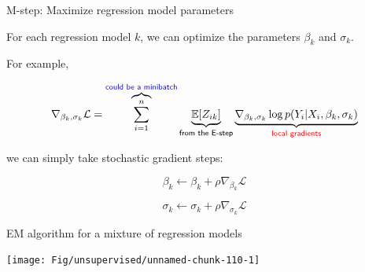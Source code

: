 \documentclass[
  ignorenonframetext,
  aspectratio=169]{beamer}
\begin{document}
\begin{frame}{M-step: Maximize regression model parameters}
\protect\hypertarget{m-step-maximize-regression-model-parameters}{}
\scriptsize

\normalsize

For each regression model \(k\), we can optimize the parameters
\(\beta_{k}\) and \(\sigma_{k}\).

For example,

\[\nabla_{\beta_{k}, \sigma_{k}} \mathcal{L} = 
\overbrace{\sum_{i=1}^{n}}^{\textsf{\color{blue} could be a minibatch}}
\underbrace{\mathbb{E}\!\left[Z_{ik}\right]}_{\textsf{from the E-step}} 
\underbrace{\nabla_{\beta_{k}, \sigma_{k}} \log p(Y_{i}|X_{i}, \beta_{k}, \sigma_{k})}_{\textsf{\color{red} local gradients}}\]

we can simply take stochastic gradient steps:

\[\beta_{k} \gets \beta_{k} + \rho \nabla_{\beta_{k}} \mathcal{L}\]

\[\sigma_{k} \gets \sigma_{k} + \rho \nabla_{\sigma_{k}} \mathcal{L}\]

\scriptsize

\normalsize
\end{frame}

\begin{frame}{EM algorithm for a mixture of regression models}
\protect\hypertarget{em-algorithm-for-a-mixture-of-regression-models}{}
\scriptsize

\begin{center}\texttt{[image: Fig/unsupervised/unnamed-chunk-110-1]} \end{center}

\normalsize
\end{frame}
\end{document}
